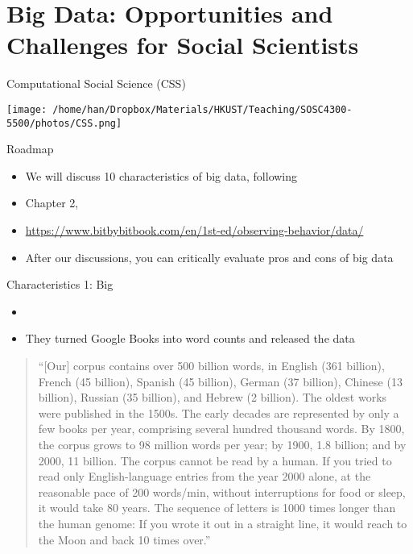 \documentclass[handout]{beamer}
\begin{document}
\section{Big Data: Opportunities and Challenges for Social Scientists}
\label{h:7da7b823-0018-4703-964a-4c02d952b693}
\begin{frame}[label={h:06fbc80e-a2ee-4e5d-a283-3596856bef36}]{Computational Social Science (CSS)}
\begin{center}
\texttt{[image: /home/han/Dropbox/Materials/HKUST/Teaching/SOSC4300-5500/photos/CSS.png]}
\end{center}
\end{frame}

\begin{frame}[label={h:9e18d988-631c-4326-8465-0ab5e06fcd0e}]{Roadmap}
\begin{itemize}
\item We will discuss 10 characteristics of big data, following
\item Chapter 2, 
\item \url{https://www.bitbybitbook.com/en/1st-ed/observing-behavior/data/}
\item After our discussions, you can critically evaluate pros and cons of big data
\end{itemize}
\end{frame}
\begin{frame}[label={h:e28d3acc-2c55-4e75-9c83-4bf4839787c4}]{Characteristics 1: Big}
\footnotesize  
\begin{itemize}
\item {}
\item They turned Google Books into word counts and released the data
\end{itemize}
\begin{quote}
“[Our] corpus contains over 500 billion words, in English (361 billion), French (45 billion), Spanish (45 billion), German (37 billion), Chinese (13 billion), Russian (35 billion), and Hebrew (2 billion). The oldest works were published in the 1500s. The early decades are represented by only a few books per year, comprising several hundred thousand words. By 1800, the corpus grows to 98 million words per year; by 1900, 1.8 billion; and by 2000, 11 billion. The corpus cannot be read by a human. If you tried to read only English-language entries from the year 2000 alone, at the reasonable pace of 200 words/min, without interruptions for food or sleep, it would take 80 years. The sequence of letters is 1000 times longer than the human genome: If you wrote it out in a straight line, it would reach to the Moon and back 10 times over.”
\end{quote}
\end{frame}
\end{document}
